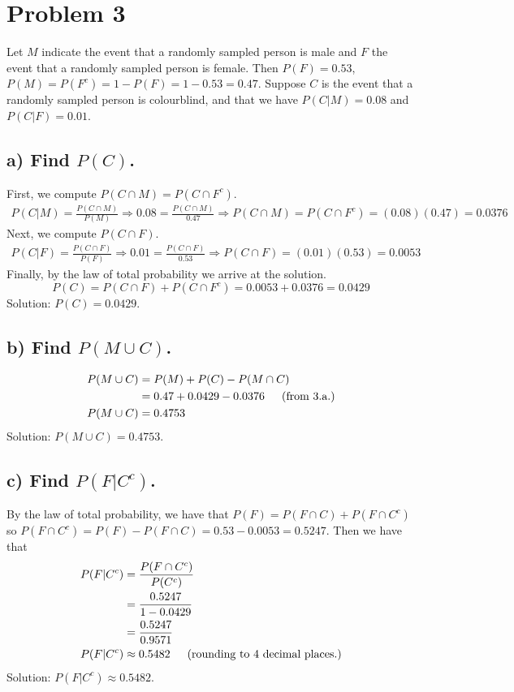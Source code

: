 \documentclass[11pt, letterpaper]{article}
\begin{document}
\section*{Problem 3}
Let $M$ indicate the event that a randomly sampled person is male and $F$ the event that a randomly
sampled person is female. Then $P(F)=0.53$, $P(M)=P(F^c)=1-P(F)=1-0.53=0.47$. Suppose $C$ is the event
that a randomly sampled person is colourblind, and that we have $P(C|M)=0.08$ and $P(C|F)=0.01$.

\subsection*{a) \normalfont Find $P(C)$.}
First, we compute $P(C\cap M)=P(C\cap F^c)$.
\begin{align*}
    P(C|M)=\frac{P(C\cap M)}{P(M)}\Rightarrow 0.08=\frac{P(C\cap M)}{0.47}\Rightarrow P(C\cap M)=P(C\cap F^c)=(0.08)(0.47)=0.0376
\end{align*}
Next, we compute $P(C\cap F)$.
\begin{align*}
    P(C|F)=\frac{P(C\cap F)}{P(F)}\Rightarrow 0.01=\frac{P(C\cap F)}{0.53}\Rightarrow P(C\cap F)=(0.01)(0.53)=0.0053
\end{align*}
Finally, by the law of total probability we arrive at the solution.
\[P(C)=P(C\cap F)+P(C\cap F^c)=0.0053+0.0376=0.0429\]
Solution: $P(C)=0.0429$.

\subsection*{b) \normalfont Find $P(M\cup C)$.}
\begin{align*}
    P(M\cup C)&=P(M)+P(C)-P(M\cap C)\\
    &=0.47+0.0429-0.0376 \text{\indent (from 3.a.)}\\
    P(M\cup C)&=0.4753
\end{align*}
Solution: $P(M\cup C)=0.4753$.

\subsection*{c) \normalfont Find $P(F|C^c)$.}
By the law of total probability, we have that $P(F)=P(F\cap C)+P(F\cap C^c)$ so $P(F\cap C^c)=P(F)-P(F\cap C)=0.53-0.0053=0.5247$.
Then we have that
\begin{align*}
    P(F|C^c)&=\frac{P(F\cap C^c)}{P(C^c)}\\
    &=\frac{0.5247}{1-0.0429}\\
    &=\frac{0.5247}{0.9571}\\
    P(F|C^c)&\approx 0.5482 \text{\indent (rounding to 4 decimal places.)}
\end{align*}
Solution: $P(F|C^c)\approx 0.5482$.
\end{document}
